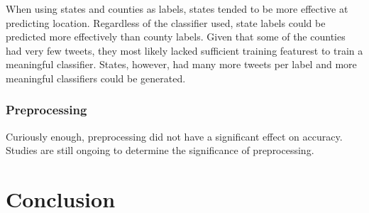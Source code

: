 \documentclass[midd]{thesis}
\begin{document}
When using states and counties as labels, states tended to be more effective at predicting location. Regardless of the classifier used, state labels could be predicted more effectively than county labels. Given that some of the counties had very few tweets, they most likely lacked sufficient training featurest to train a meaningful classifier. States, however, had many more tweets per label and more meaningful classifiers could be generated.

\subsection{Preprocessing}

Curiously enough, preprocessing did not have a significant effect on accuracy. Studies are still ongoing to determine the significance of preprocessing.


\chapter{Conclusion}


\appendix
\end{document}
